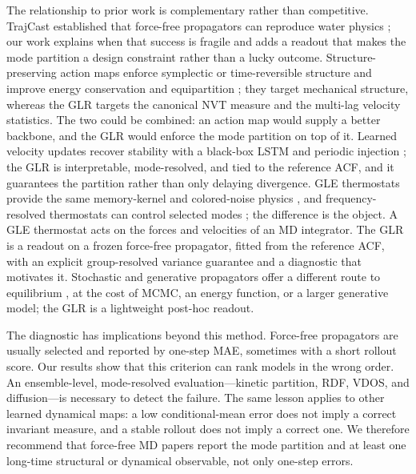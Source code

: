 The relationship to prior work is complementary rather than competitive. TrajCast established that
force-free propagators can reproduce water physics \cite{trajcast}; our work explains when that
success is fragile and adds a readout that makes the mode partition a design constraint rather
than a lucky outcome. Structure-preserving action maps enforce symplectic or time-reversible
structure and improve energy conservation and equipartition \cite{bigi_action}; they target
mechanical structure, whereas the GLR targets the canonical NVT measure and the multi-lag velocity
statistics. The two could be combined: an action map would supply a better backbone, and the GLR
would enforce the mode partition on top of it. Learned velocity updates recover stability with a
black-box LSTM and periodic injection \cite{mamd}; the GLR is interpretable, mode-resolved, and
tied to the reference ACF, and it guarantees the partition rather than only delaying divergence.
GLE thermostats provide the same memory-kernel and colored-noise physics
\cite{ceriotti_prl,ceriotti_jctc}, and frequency-resolved thermostats can control selected modes
\cite{zpe_thermostat}; the difference is the object. A GLE thermostat acts on the forces and
velocities of an MD integrator. The GLR is a readout on a frozen force-free propagator, fitted from
the reference ACF, with an explicit group-resolved variance guarantee and a diagnostic that motivates it.
Stochastic and generative propagators offer a different route to equilibrium
\cite{timewarp,mdgen}, at the cost of MCMC, an energy function, or a larger generative model; the
GLR is a lightweight post-hoc readout.

The diagnostic has implications beyond this method. Force-free propagators are usually selected and
reported by one-step MAE, sometimes with a short rollout score. Our results show that this
criterion can rank models in the wrong order. An ensemble-level, mode-resolved
evaluation---kinetic partition, RDF, VDOS, and diffusion---is necessary to detect the failure. The
same lesson applies to other learned dynamical maps: a low conditional-mean error does not imply a
correct invariant measure, and a stable rollout does not imply a correct one. We therefore
recommend that force-free MD papers report the mode partition and at least one long-time structural
or dynamical observable, not only one-step errors.


